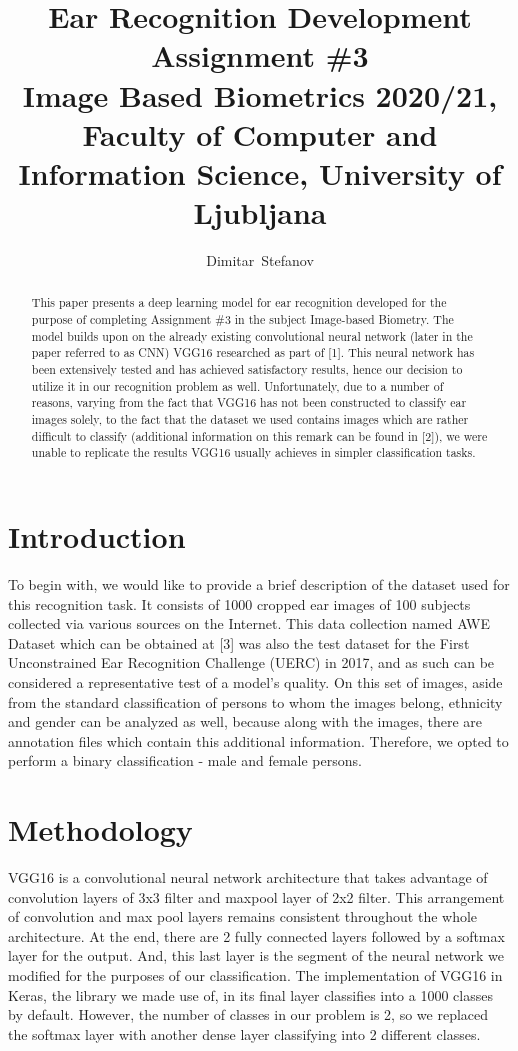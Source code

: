 \documentclass[9pt]{IEEEtran}
\title{\vspace{0ex} %
Ear Recognition Development
\\ \large{Assignment \#3}\\ \normalsize{Image Based Biometrics 2020/21, Faculty of Computer and Information Science, University of Ljubljana}}
\author{ %
Dimitar~Stefanov
\vspace{-4.0ex}
}
\begin{document}
\maketitle

\begin{abstract}
This paper presents a deep learning model for ear recognition developed for the purpose of completing Assignment \#3 in the subject Image-based Biometry. The model builds upon on the already existing convolutional neural network (later in the paper referred to as CNN) VGG16 researched as part of [1]. This neural network has been extensively tested and has achieved satisfactory results, hence our decision to utilize it in our recognition problem as well. Unfortunately, due to a number of reasons, varying from the fact that VGG16 has not been constructed to classify ear images solely, to the fact that the dataset we used contains images which are rather difficult to classify (additional information on this remark can be found in [2]), we were unable to replicate the results VGG16 usually achieves in simpler classification tasks.
\end{abstract}

\section{Introduction}
To begin with, we would like to provide a brief description of the dataset used for this recognition task. It consists of 1000 cropped ear images of 100 subjects collected via various sources on the Internet. This data collection named AWE Dataset which can be obtained at [3] was also the test dataset for the First Unconstrained Ear Recognition Challenge (UERC) in 2017, and as such can be considered a representative test of a model's quality. On this set of images, aside from the standard classification of persons to whom the images belong, ethnicity and gender can be analyzed as well, because along with the images, there are annotation files which contain this additional information. Therefore, we opted to perform a binary classification - male and female persons.

\section{Methodology}
VGG16 is a convolutional neural network architecture that takes advantage of convolution layers of 3x3 filter and maxpool layer of 2x2 filter. This arrangement of convolution and max pool layers remains consistent throughout the whole architecture. At the end, there are 2 fully connected layers followed by a softmax layer for the output. And, this last layer is the segment of the neural network we modified for the purposes of our classification. The implementation of VGG16 in Keras, the library we made use of, in its final layer classifies into a 1000 classes by default. However, the number of classes in our problem is 2, so we replaced the softmax layer with another dense layer classifying into 2 different classes.
\end{document}
